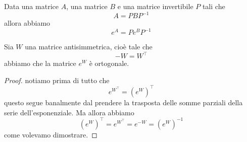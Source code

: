 \documentclass[11pt]{scrartcl}
\begin{document}
	\begin{lemma}
		Data una matrice $A$, una matrice $B$ e una matrice invertibile $P$ tali che
		$$A=PBP^{-1}$$
		allora abbiamo
		$$e^A=Pe^BP^{-1}$$
	\end{lemma}
	\begin{proposition}
		Sia $W$ una matrice antisimmetrica, cioè tale che
		$$-W=W^\intercal$$
		abbiamo che la matrice $e^W$ è ortogonale. 
	\end{proposition}
	\begin{proof}
		notiamo prima di tutto che 
		$$e^{W^\intercal}=\left(e^W\right)^\intercal$$
		questo segue banalmente dal prendere la trasposta delle somme parziali della serie dell'esponenziale. Ma allora abbiamo
		$$\left(e^W\right)^\intercal=e^{W^\intercal}=e^{-W}=\left(e^W\right)^{-1}$$
		come volevamo dimostrare.
	\end{proof}
\end{document}
